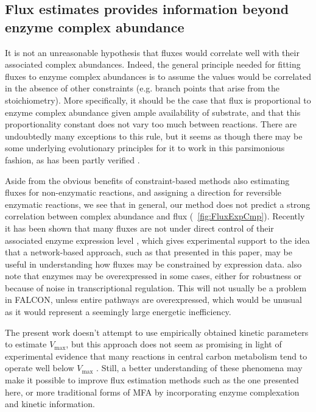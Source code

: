\subsection{Flux estimates provides information beyond enzyme complex abundance}
It is not an unreasonable hypothesis that fluxes would correlate well
with their associated complex abundances. Indeed, the general
principle needed for fitting fluxes to enzyme complex abundances is to
assume the values would be correlated in the absence of other
constraints (e.g. branch points that arise from the
stoichiometry). More specifically, it should be the case that flux is
proportional to enzyme complex abundance given ample availability of
substrate, and that this proportionality constant does not vary too
much between reactions.  There are undoubtedly many exceptions to this
rule, but it seems as though there may be some underlying evolutionary
principles for it to work in this parsimonious fashion, as has been
partly verified \citep{Bennett2009}.

Aside from the obvious benefits
of constraint-based methods also estimating fluxes for non-enzymatic
reactions, and assigning a direction for reversible enzymatic
reactions, we see that in general, our method does not predict a
strong correlation between complex abundance and flux
(\suppOrApp \Fig~\ref{fig:FluxExpCmp}). 
Recently it has been shown that many fluxes are not
under direct control of their associated enzyme expression
level \citep{Chubukov2013}, which gives experimental support to the
idea that a network-based approach, such as that
presented in this paper, may be useful in understanding how fluxes may
be constrained by expression data. \citealt{Chubukov2013} also note that enzymes
may be overexpressed in some cases, either for robustness or because
of noise in transcriptional regulation. This will not usually be a
problem in FALCON, unless entire pathways are overexpressed, which
would be unusual as it would represent a seemingly large energetic
inefficiency.

The present work doesn't attempt to use empirically
obtained kinetic parameters to estimate $V_{\max}$, but this approach
does not seem as promising in light of experimental evidence that many
reactions in central carbon metabolism tend to operate well below
$V_{\max}$ \citep{Bennett2009}. Still, a better understanding of these
phenomena may make it possible to improve flux estimation methods such
as the one presented here, or more traditional forms of MFA
\citep{Shestov2013a} by incorporating enzyme complexation and kinetic
information.


